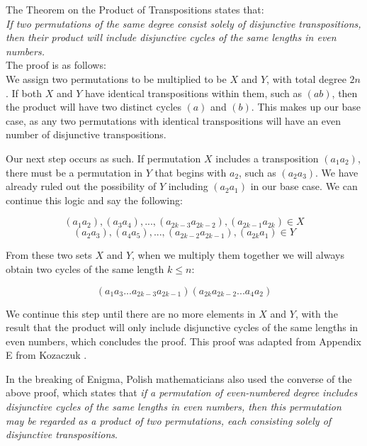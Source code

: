 The Theorem on the Product of Transpositions states that:
\\

\textit{If two permutations of the same degree consist solely of disjunctive transpositions, then their product will include disjunctive cycles of the same lengths in even numbers.}
\\

The proof is as follows:
\\

We assign two permutations to be multiplied to be $X$ and $Y$, with total degree $2n$. If both $X$ and $Y$ have identical transpositions within them, such as $(ab)$, then the product will have two distinct cycles $(a)$ and $(b)$. This makes up our base case, as any two permutations with identical transpositions will have an even number of disjunctive transpositions.

Our next step occurs as such. If permutation $X$ includes a transposition $(a_1 a_2)$, there must be a permutation in $Y$ that begins with $a_2$, such as $(a_2 a_3)$. We have already ruled out the possibility of $Y$ including $(a_2 a_1)$ in our base case. We can continue this logic and say the following:

$$(a_1 a_2), (a_3 a_4), ..., (a_{2k-3} a_{2k-2}), (a_{2k-1} a_{2k}) \in X$$
$$(a_2 a_3), (a_4 a_5), ..., (a_{2k-2} a_{2k-1}), (a_{2k} a_{1}) \in Y$$

From these two sets $X$ and $Y$, when we multiply them together we will always obtain two cycles of the same length $k \leq n$:

$$(a_1 a_3 ... a_{2k-3} a_{2k-1}) (a_{2k} a_{2k-2} ... a_4 a_2)$$

We continue this step until there are no more elements in $X$ and $Y$, with the result that the product will only include disjunctive cycles of the same lengths in even numbers, which concludes the proof. This proof was adapted from Appendix E from Kozaczuk \cite{wk85}.

In the breaking of Enigma, Polish mathematicians also used the converse of the above proof, which states that \textit{if a permutation of even-numbered degree includes disjunctive cycles of the same lengths in even numbers, then this permutation may be regarded as a product of two permutations, each consisting solely of disjunctive transpositions}.
\begingroup
\renewcommand{\cleardoublepage}{}
\renewcommand{\clearpage}{}